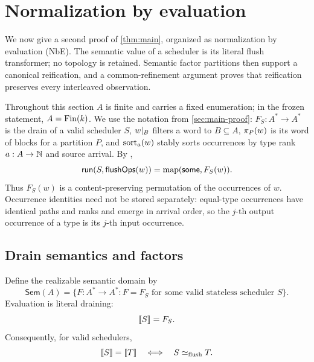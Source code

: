 \section{Normalization by evaluation}
\label{sec:nbe}

We now give a second proof of \autoref{thm:main}, organized as normalization by
evaluation (NbE).  The semantic value of a scheduler is its literal flush
transformer; no topology is retained.  Semantic factor partitions then support
a canonical reification, and a common-refinement argument proves that
reification preserves every interleaved observation.

Throughout this section \(A\) is finite and carries a fixed enumeration; in the
frozen statement, \(A=\operatorname{Fin}(k)\).  We use the notation from
\autoref{sec:main-proof}: \(F_S:A^*\to A^*\) is the drain of a valid scheduler
\(S\), \(w\mathord{|}_{B}\) filters a word to \(B\subseteq A\),
\(\pi_{P}(w)\) is its word of blocks for a partition \(P\), and
\(\operatorname{sort}_a(w)\) stably sorts occurrences by type rank \(a:A\to\mathbb{N}\) and
source arrival.  By ,
\[
  \mathsf{run}(S,\mathsf{flushOps}(w))=\operatorname{map}(\mathsf{some},F_S(w)).
\]
Thus \(F_S(w)\) is a content-preserving permutation of the occurrences of
\(w\).  Occurrence identities need not be stored separately: equal-type
occurrences have identical paths and ranks and emerge in arrival order, so the
\(j\)-th output occurrence of a type is its \(j\)-th input occurrence.

\subsection{Drain semantics and factors}

\begin{definition}
\label{def:nbe-semantics}
Define the realizable semantic domain by
\begin{equation}
 \mathsf{Sem}(A)
 =\{F:A^*\to A^*:F=F_S\text{ for some valid stateless scheduler }S\}.
 \label{eq:nbe-semantic-domain}
\end{equation}
Evaluation is literal draining:
\begin{equation}
  \mathopen{[\![}S\mathclose{]\!]}=F_S.
  \label{eq:nbe-evaluation}
\end{equation}
Consequently, for valid schedulers,
\[
  \mathopen{[\![}S\mathclose{]\!]}=\mathopen{[\![}T\mathclose{]\!]}
  \quad\Longleftrightarrow\quad S\mathrel{\simeq_{\mathrm{flush}}} T.
\]
\end{definition}

